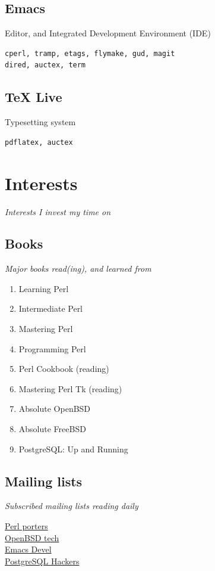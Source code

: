 \documentclass {article}
\begin{document}
    \subsection{Emacs}
    Editor, and Integrated Development Environment (IDE)
      \begin{verbatim}
cperl, tramp, etags, flymake, gud, magit
dired, auctex, term
   \end{verbatim}

    \subsection{TeX Live}
    Typesetting system
      \begin{verbatim}
pdflatex, auctex
   \end{verbatim}

  \section{Interests}
  \textit{Interests I invest my time on}

    \subsection{Books}
      \textit{Major books read(ing), and learned from}
      \begin{enumerate}
        \item{Learning Perl\cite{learning_perl}}
        \item{Intermediate Perl\cite{intermediate_perl}}
        \item{Mastering Perl\cite{mastering_perl}}
        \item{Programming Perl\cite{programming_perl}}
        \item{Perl Cookbook\cite{perl_cookbook}} (reading)
        \item{Mastering Perl Tk\cite{perl_tk}} (reading)
        \item{Absolute OpenBSD\cite{absolute_openbsd}}
        \item{Absolute FreeBSD\cite{absolute_freebsd}}
        \item{PostgreSQL: Up and Running\cite{postgresql}}
      \end{enumerate}

    \subsection{Mailing lists}
      \textit{Subscribed mailing lists reading daily}
      \begin{description}
        \item[\href{https://lists.perl.org/list/perl5-porters.html}{Perl porters}]
        \item[\href{https://www.openbsd.org/mail.html}{OpenBSD tech}]
        \item[\href{https://lists.gnu.org/mailman/listinfo/emacs-devel}{Emacs Devel}]
        \item[\href{https://www.postgresql.org/list/pgsql-hackers/}{PostgreSQL Hackers}]
      \end{description}
\end{document}
